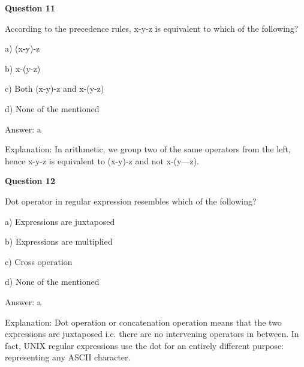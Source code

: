\documentclass{article}
\begin{document}
\begin{mdframed}[linewidth=1pt, roundcorner=5pt, linecolor=gray!30, backgroundcolor=gray!5]
\textbf{Question 11} 

According to the precedence rules, x-y-z is equivalent to which of the following?

a) (x-y)-z

b) x-(y-z)

c) Both (x-y)-z and x-(y-z)

d) None of the mentioned
\vspace{5pt} \par
\begin{tcolorbox}[colback=green!5, colframe=green!40!black, title=Solution]
Answer: a

Explanation: In arithmetic, we group two of the same operators from the left, hence x-y-z is equivalent to (x-y)-z and not x-(y—z).
\end{tcolorbox}
\end{mdframed}

\begin{mdframed}[linewidth=1pt, roundcorner=5pt, linecolor=gray!30, backgroundcolor=gray!5]
\textbf{Question 12} 

Dot operator in regular expression resembles which of the following?

a) Expressions are juxtaposed

b) Expressions are multiplied

c) Cross operation

d) None of the mentioned
\vspace{5pt} \par
\begin{tcolorbox}[colback=green!5, colframe=green!40!black, title=Solution]
Answer: a

Explanation: Dot operation or concatenation operation means that the two expressions are juxtaposed i.e. there are no intervening operators in between. In fact, UNIX regular expressions use the dot for an entirely different purpose: representing any ASCII character.
\end{tcolorbox}
\end{mdframed}
\newpage
\end{document}
